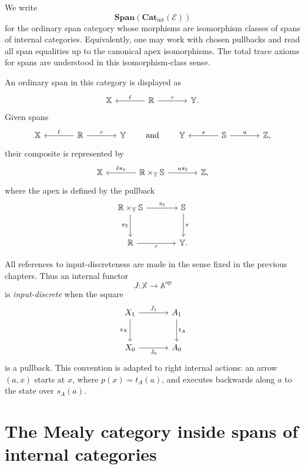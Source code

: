 We write
\[
\mathbf{Span}(\mathbf{Cat}_{\mathrm{int}}(\mathcal E))
\]
for the ordinary span category whose morphisms are isomorphism classes of
spans of internal categories.  Equivalently, one may work with chosen
pullbacks and read all span equalities up to the canonical apex isomorphisms.
The total trace axioms for spans are understood in this isomorphism-class
sense.

An ordinary span in this category is displayed as
\[
\begin{tikzcd}[column sep=large]
\mathbb X
&
\mathbb R
  \arrow[l, "\ell"']
  \arrow[r, "r"]
&
\mathbb Y .
\end{tikzcd}
\]
Given spans
\[
\begin{tikzcd}[column sep=large]
\mathbb X
&
\mathbb R
  \arrow[l, "\ell"']
  \arrow[r, "r"]
&
\mathbb Y
\end{tikzcd}
\qquad
\text{and}
\qquad
\begin{tikzcd}[column sep=large]
\mathbb Y
&
\mathbb S
  \arrow[l, "s"']
  \arrow[r, "u"]
&
\mathbb Z,
\end{tikzcd}
\]
their composite is represented by
\[
\begin{tikzcd}[column sep=large]
\mathbb X
&
\mathbb R\times_{\mathbb Y}\mathbb S
  \arrow[l, "\ell\pi_{\mathbb R}"']
  \arrow[r, "u\pi_{\mathbb S}"]
&
\mathbb Z,
\end{tikzcd}
\]
where the apex is defined by the pullback
\[
\begin{tikzcd}[column sep=large,row sep=large]
\mathbb R\times_{\mathbb Y}\mathbb S
  \arrow[r, "\pi_{\mathbb S}"]
  \arrow[d, "\pi_{\mathbb R}"']
&
\mathbb S
  \arrow[d, "s"]
\\
\mathbb R
  \arrow[r, "r"']
&
\mathbb Y .
\end{tikzcd}
\]

All references to input-discreteness are made in the sense fixed in the
previous chapters.  Thus an internal functor
\[
J:\mathbb X\to\mathbb A^{\mathrm{op}}
\]
is \emph{input-discrete} when the square
\[
\begin{tikzcd}[column sep=large,row sep=large]
X_1
  \arrow[r,"J_1"]
  \arrow[d,"s_X"']
&
A_1
  \arrow[d,"t_A"]
\\
X_0
  \arrow[r,"J_0"']
&
A_0
\end{tikzcd}
\]
is a pullback.  This convention is adapted to right internal actions: an
arrow \((a,x)\) starts at \(x\), where \(p(x)=t_A(a)\), and executes backwards
along \(a\) to the state over \(s_A(a)\).

\section{The Mealy category inside spans of internal categories}
\label{sec:mealy-category-inside-spans-internal-categories}

